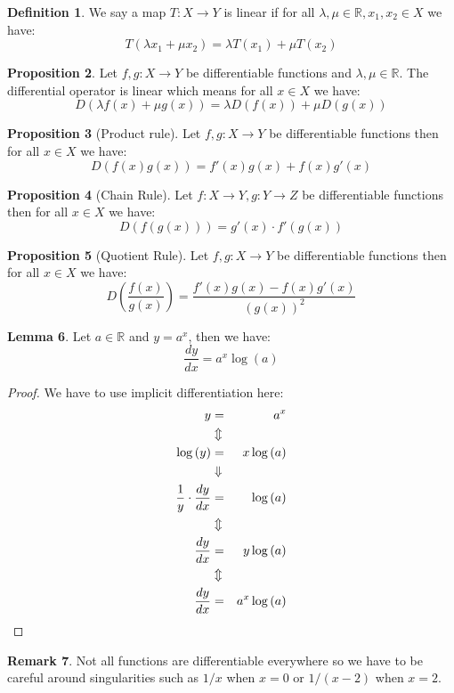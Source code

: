 \documentclass[11pt]{article}
\theoremstyle{definition}
\newtheorem{prop}{Proposition}[section]
\newtheorem{lemma}[prop]{Lemma}
\newtheorem{rmk}[prop]{Remark}
\newtheorem{defn}[prop]{Definition}
\newcommand{\brac}[1]{\left(#1\right)}
\newcommand{\diff}[2]{\frac{d\ifthenelse{\equal{#1}{}}{}{#1}}{d#2}}
\newcommand{\R}{\mathbb{R}}
\begin{document}
	\begin{defn}
		We say a map $T:X\rightarrow Y$ is linear if for all $\lambda,\mu\in \R, x_1, x_2\in X$ we have:
		$$ T\brac{\lambda x_1 + \mu x_2} = \lambda T\brac{x_1} + \mu T\brac{x_2}$$
	\end{defn}
	\begin{prop}
		Let $f,g:X\rightarrow Y$ be differentiable functions and $\lambda,\mu\in \R$. The differential operator is linear which means for all $x\in X$ we have:
		$$ D\brac{\lambda f\brac{x} + \mu g\brac{x}} = \lambda D\brac{f\brac{x}} + \mu D\brac{g\brac{x}}$$
	\end{prop}
	\begin{prop}[Product rule]
		Let $f,g:X\rightarrow Y$ be differentiable functions then for all $x\in X$ we have:
		$$ D\brac{f\brac{x}g\brac{x}} = f'\brac{x}g\brac{x} + f\brac{x}g' \brac{x}$$
	\end{prop}
	\begin{prop}[Chain Rule]
		Let $f:X\rightarrow Y, g:Y\rightarrow Z$ be differentiable functions then for all $x\in X$ we have:
		$$ D\brac{f\brac{g\brac{x}}} = g'\brac{x}\cdot f'\brac{g\brac{x}}$$
	\end{prop}
	\begin{prop}[Quotient Rule]
		Let $f,g:X\rightarrow Y$ be differentiable functions then for all $x\in X$ we have:
		$$ D\brac{\frac{f\brac{x}}{g\brac{x}}} = \frac{f'\brac{x}g\brac{x} - f\brac{x}g'\brac{x}}{\brac{g\brac{x}}^2}$$
	\end{prop}
	\begin{lemma}
		Let $a\in\R$ and $y = a^x$, then we have:
		$$ \frac{dy}{dx} = a^x\log\brac{a}$$
	\end{lemma}
	\begin{proof}
		We have to use implicit differentiation here:
		\begin{eqnarray*}
			y &=& a^x\\
			&\Updownarrow&\\
			\log\brac{y} &=& x\log\brac{a}\\
			&\Downarrow&\\
			\frac{1}{y}\cdot\diff{y}{x} &=& \log\brac{a}\\
			&\Updownarrow&\\
			\diff{y}{x} &=& y\log\brac{a}\\
			&\Updownarrow&\\
			\diff{y}{x} &=& a^x \log\brac{a}
		\end{eqnarray*}
	\end{proof}
	\begin{rmk}
		Not all functions are differentiable everywhere so we have to be careful around singularities such as $1/x$ when $x=0$ or $1/\brac{x-2}$ when $x=2$.
	\end{rmk}
\end{document}

